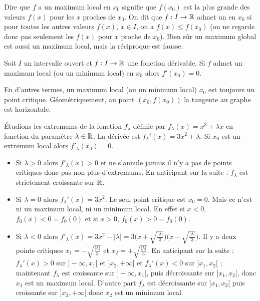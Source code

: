 \documentclass[class=report,crop=false]{standalone}
\begin{document}

Dire que $f$ a un maximum local en $x_0$ signifie que $f(x_0)$ est la plus grande des valeurs $f(x)$ pour les $x$ proches de $x_0$.
On dit que $f : I \to \mathbb{R}$ admet un  en $x_0$ si pour toutes les autres valeurs $f(x)$, $x\in I$,
on a $f(x) \le f(x_0)$ (on ne regarde donc pas seulement les $f(x)$ pour $x$ proche de $x_0$).
Bien sûr un maximum global est aussi un maximum local, mais la réciproque est fausse.

\begin{theoreme}
\label{th:extremum}
Soit $I$ un intervalle ouvert et $f : I \to \mathbb{R}$ une fonction
dérivable. Si $f$ admet un maximum local (ou un minimum local)
en $x_0$ alors $f'(x_0)=0$.
\end{theoreme}

En d'autres termes, un maximum local (ou un minimum local) $x_0$ est toujours un point critique.
Géométriquement, au point $(x_0,f(x_0))$
la tangente au graphe est horizontale.


\begin{exemple}
\'Etudions les extremums de la fonction $f_\lambda$ définie par
$f_\lambda(x)= x^3+\lambda x$ en fonction du paramètre $\lambda \in \mathbb{R}$.
La dérivée est $f_\lambda'(x) = 3x^2+\lambda$. Si $x_0$ est un extremum local
alors $f'_\lambda(x_0)=0$.

\begin{itemize}
  \item Si $\lambda>0$ alors $f'_\lambda(x)>0$ et ne s'annule jamais il n'y a pas de points critiques
donc pas non plus d'extremums. En anticipant sur la suite : $f_\lambda$ est strictement croissante sur $\mathbb{R}$.

  \item Si $\lambda = 0$ alors $f_\lambda'(x)=3x^2$. Le seul point critique est $x_0=0$.
Mais ce n'est ni un maximum local, ni un minimum local. En effet si $x<0$, $f_0(x)<0=f_0(0)$
et si $x>0$, $f_0(x)>0=f_0(0)$.

  \item Si $\lambda <0$ alors $f'_\lambda(x)= 3x^2-|\lambda|
= 3\big(x+\sqrt{\frac{|\lambda|}{3}}\big)\big(x-\sqrt{\frac{|\lambda|}{3}}\big)$.
Il y a deux points critiques $x_1= -\sqrt{\frac{|\lambda|}{3}}$ et $x_2=+\sqrt{\frac{|\lambda|}{3}}$.
En anticipant sur la suite : $f_\lambda'(x) > 0$ sur $]-\infty,x_1[$ et $]x_2,+\infty[$
et $f_\lambda'(x) < 0$ sur $]x_1,x_2[$ ;
maintenant $f_\lambda$ est croissante sur $]-\infty,x_1[$, puis décroissante sur $]x_1,x_2[$,
donc $x_1$ est un maximum local. D'autre part $f_\lambda$ est décroissante sur $]x_1,x_2[$
puis croissante sur $]x_2,+\infty[$ donc $x_2$ est un minimum local.

\medskip


\end{itemize}
\end{exemple}
\end{document}
